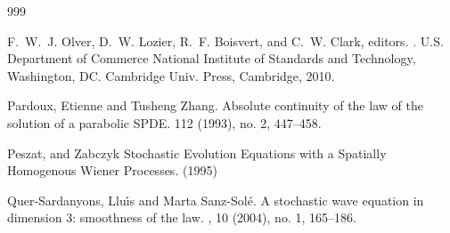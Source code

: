 \documentclass[a4paper,11pt]{article}
\theoremstyle{plain}
\theoremstyle{definition}
\numberwithin{NQ}{section}
\numberwithin{LQ}{section}
\numberwithin{ZQ}{section}
\begin{document}
\begin{small}
\begin{thebibliography}{999}

%
F.~W.~J. Olver, D.~W. Lozier, R.~F. Boisvert, and C.~W. Clark, editors.
.
\newblock U.S. Department of Commerce National Institute of Standards  and Technology, Washington, DC. Cambridge Univ. Press, Cambridge, 2010.

Pardoux, Etienne and Tusheng Zhang.
\newblock Absolute continuity of the law of the solution of a parabolic SPDE.
 112 (1993), no. 2, 447--458.
 
Peszat, and Zabczyk
\newblock Stochastic Evolution Equations with a Spatially Homogenous Wiener Processes.
 (1995)
 
Quer-Sardanyons, Llu{\'{\i}}s and Marta Sanz-Sol{\'e}.
\newblock A stochastic wave equation in dimension 3: smoothness of the law.
, 10 (2004), no. 1, 165--186. 


%






\end{thebibliography}
\end{small}
\end{document}
